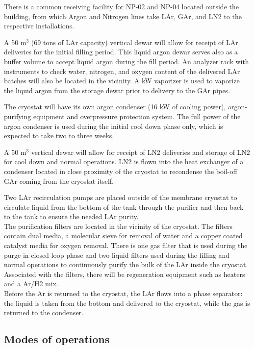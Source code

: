 There is a common receiving facility for NP-02 and NP-04 located outside the building, from which Argon and Nitrogen lines take LAr, GAr, and LN2 to the respective installations.

A 50 m$^3$ (69 tons of LAr capacity) vertical dewar will allow for receipt of LAr deliveries for the initial filling period. This liquid argon dewar serves also as a buffer volume to accept liquid argon during the fill period. An analyzer rack with instruments to check water, nitrogen, and oxygen content of the delivered LAr batches will also be located in the vicinity. A  kW vaporizer is used to vaporize the liquid argon from the storage dewar prior to delivery to the GAr pipes.

The cryostat will have its own argon condenser (16 kW of cooling power), argon-purifying equipment and overpressure protection system. The full power of the argon condenser is used during the initial cool down phase only, which is expected to take two to three weeks. 

A 50 m$^3$ vertical dewar will allow for receipt of LN2 deliveries and storage of LN2 for cool down and normal operations. LN2 is flown into the heat exchanger of a condenser located in close proximity of the cryostat to recondense the boil-off GAr coming from the cryostat itself.

Two LAr recirculation pumps are placed outside of the membrane cryostat to circulate liquid from the bottom of the tank through the purifier and then back to the tank to ensure the needed LAr purity.\\
%
The purification filters are located in the vicinity of the cryostat. The filters contain dual media, a molecular sieve for removal of water and a copper coated catalyst media for oxygen removal. There is one gas filter that is used during the purge in closed loop phase and two liquid filters used during the filling and normal operations to continuously purify the bulk of the LAr inside the cryostat. Associated with the filters, there will be regeneration equipment such as heaters and a Ar/H2 mix.\\
%
Before the Ar is returned to the cryostat, the LAr flows into a phase separator: the liquid is taken from the bottom and delivered to the cryostat, while the gas is returned to the condenser.


\subsection{Modes of operations}
\label{sec:cryo-op-modes}

